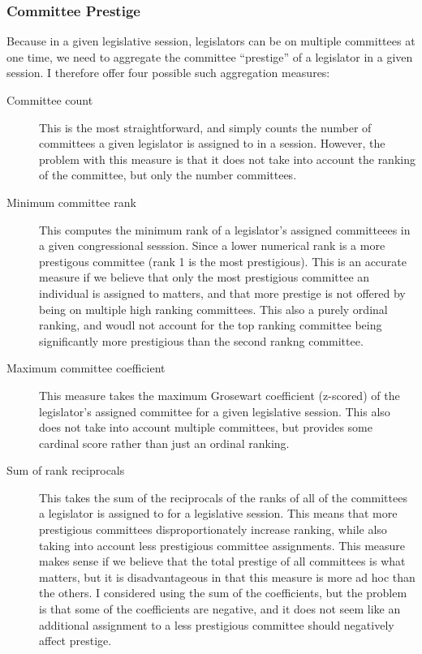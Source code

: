 \documentclass{article}
\begin{document}
\subsubsection{Committee Prestige}
Because in a given legislative session, legislators can be on multiple committees at one time, we need to aggregate the committee ``prestige'' of a legislator in a given session. I therefore offer four possible such aggregation measures:
\begin{description}
    \item[Committee count] This is the most straightforward, and simply counts the number of committees a given legislator is assigned to in a session. However, the problem with this measure is that it does not take into account the ranking of the committee, but only the number committees.
    \item[Minimum committee rank] This computes the minimum rank of a legislator's assigned committeees in a given congressional sesssion. Since a lower numerical rank is a more prestigous committee (rank 1 is the most prestigious). This is an accurate measure if we believe that only the most prestigious committee an individual is assigned to matters, and that more prestige is not offered by being on multiple high ranking committees. This also a purely ordinal ranking, and woudl not account for the top ranking committee being significantly more prestigious than the second rankng committee.
    \item[Maximum committee coefficient] This measure takes the maximum Grosewart coefficient (z-scored) of the legislator's assigned committee for a given legislative session. This also does not take into account multiple committees, but provides some cardinal score rather than just an ordinal ranking. 
    \item[Sum of rank reciprocals] This takes the sum of the reciprocals of the ranks of all of the committees a legislator is assigned to for a legislative session. This means that more prestigious committees disproportionately increase ranking, while also taking into account less prestigious committee assignments. This measure makes sense if we believe that the total prestige of all committees is what matters, but it is disadvantageous in that this measure is more ad hoc than the others. I considered using the sum of the coefficients, but the problem is that some of the coefficients are negative, and it does not seem like an additional assignment to a less prestigious committee should negatively affect prestige. 
\end{description}

\printbibliography
\end{document}
